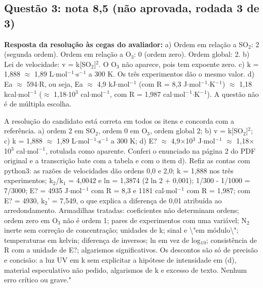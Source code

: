 \documentclass{article}%
\begin{document}
\subsection*{Questão 3: nota 8,5 (não aprovada, rodada 3 de 3)}%
\textbf{Resposta da resolução às cegas do avaliador:} a) Ordem em relação a SO$_{2}$: 2 (segunda ordem). Ordem em relação a O$_{3}$: 0 (ordem zero). Ordem global: 2.\newline%
\newline%
b) Lei de velocidade: v = k{[}SO$_{2}${]}$^2$. O O$_{3}$ não aparece, pois tem expoente zero.\newline%
\newline%
c) k = 1,888 $\approx$ 1,89 L$\cdot$mol$^{-}$$^{1}$$\cdot$s$^{-}$$^{1}$ a 300 K. Os três experimentos dão o mesmo valor.\newline%
\newline%
d) Ea $\approx$ 594$\cdot$R, ou seja, Ea $\approx$ 4,9 kJ$\cdot$mol$^{-}$$^{1}$ (com R = 8,3 J$\cdot$mol$^{-}$$^{1}$$\cdot$K$^{-}$$^{1}$) $\approx$ 1,18 kcal$\cdot$mol$^{-}$$^{1}$ ($\approx$ 1,18$\cdot$10$^3$ cal$\cdot$mol$^{-}$$^{1}$, com R = 1,987 cal$\cdot$mol$^{-}$$^{1}$$\cdot$K$^{-}$$^{1}$). A questão não é de múltipla escolha.\par %
A resolução do candidato está correta em todos os itens e concorda com a referência. a) ordem 2 em SO$_{2}$, ordem 0 em O$_{3}$, ordem global 2; b) v = k{[}SO$_{2}${]}$^2$; c) k = 1,888 $\approx$ 1,89 L$\cdot$mol$^{-}$$^{1}$$\cdot$s$^{-}$$^{1}$ a 300 K; d) E? $\approx$ 4,9$\times$10$^3$ J$\cdot$mol$^{-}$$^{1}$ $\approx$ 1,18$\times$10$^3$ cal$\cdot$mol$^{-}$$^{1}$, rotulada como aparente. Conferi o enunciado na página 2 do PDF original e a transcrição bate com a tabela e com o item d). Refiz as contas com python3: as razões de velocidades dão ordens 0,0 e 2,0; k = 1,888 nos três experimentos; k$_{2}$/k$_{1}$ = 4,0042 e ln = 1,3874 (2 ln 2 + 0,001); 1/300 - 1/1000 = 7/3000; E? = 4935 J$\cdot$mol$^{-}$$^{1}$ com R = 8,3 e 1181 cal$\cdot$mol$^{-}$$^{1}$ com R = 1,987; com E? = 4930, k$_{2}$' = 7,549, o que explica a diferença de 0,01 atribuída ao arredondamento. Armadilhas tratadas: coeficientes não determinam ordens; ordem zero em O$_{3}$ não é ordem 1; pares de experimentos com uma variável; N$_{2}$ inerte sem correção de concentração; unidades de k; sinal e \textbackslash{}"em módulo\textbackslash{}"; temperaturas em kelvin; diferença de inversos; ln em vez de log$_{1}$$_{0}$; consistência de R com a unidade de E?; algarismos significativos. Os descontos são só de precisão e concisão: a luz UV em k sem explicitar a hipótese de intensidade em (d), material especulativo não pedido, algarismos de k e excesso de texto. Nenhum erro crítico ou grave."%
\end{document}
